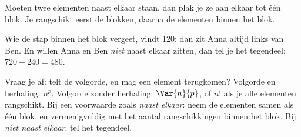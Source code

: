 Moeten twee elementen naast elkaar staan, dan plak je ze aan elkaar tot één blok. Je rangschikt eerst de blokken, daarna de elementen binnen het blok.


Wie de stap binnen het blok vergeet, vindt 120: dan zit Anna altijd links van Ben. En willen Anna en Ben \textit{niet} naast elkaar zitten, dan tel je het tegendeel: $720 - 240 = 480$.

\begin{werkwijze}
Vraag je af: telt de volgorde, en mag een element terugkomen? Volgorde en herhaling: $n^p$. Volgorde zonder herhaling: $\Var{n}{p}$, of $n!$ als je alle elementen rangschikt. Bij een voorwaarde zoals \textit{naast elkaar}: neem de elementen samen als één blok, en vermenigvuldig met het aantal rangschikkingen binnen het blok. Bij \textit{niet naast elkaar}: tel het tegendeel.
\end{werkwijze}

\begin{oefeningen}
\end{oefeningen}

\opdrachtenkop

